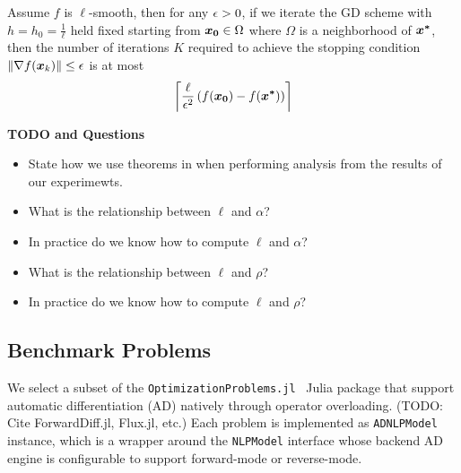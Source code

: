 \documentclass[10pt]{article}
\begin{document}
            \begin{theorem}
                Assume $f$ is $\ell$-smooth, then for any $\epsilon > 0$, if we iterate
                the GD scheme with $h = h_0 = \frac{1}{\ell}$ held fixed starting from
                $\bm{x_0} \in \Omega$ where $\Omega$ is a neighborhood of $\bm{x^*}$,
                then the number of iterations $K$ required to achieve the stopping condition
                $\| \nabla f(\bm{x}_k) \| \leq \epsilon$ is at most
                $$
                    \left\lceil \frac{\ell}{\epsilon^{2}} \, (f(\bm{x_0}) - f(\bm{x^*})) \right\rceil
                $$
            \end{theorem}

            \begin{remark}
                \textbf{TODO and Questions}
                \begin{itemize}
                    \item State how we use theorems in when performing analysis from
                    the results of our experimewts.
                    \item What is the relationship between $\ell$ and $\alpha$?
                    \item In practice do we know how to compute $\ell$ and $\alpha$?
                    \item What is the relationship between $\ell$ and $\rho$?
                    \item In practice do we know how to compute $\ell$ and $\rho$?
                \end{itemize}
            \end{remark}

        \medskip
    

    \subsection{Benchmark Problems}
        \label{intro:problems}
        We select a subset of the \texttt{OptimizationProblems.jl}~\cite{OptimizationProblems}
        Julia package that support automatic differentiation (AD) natively through operator
        overloading. (TODO: Cite ForwardDiff.jl, Flux.jl, etc.) Each problem is implemented
        as \texttt{ADNLPModel} instance, which is a wrapper around the \texttt{NLPModel} interface
        whose backend AD engine is configurable to support forward-mode or reverse-mode.

\end{document}
